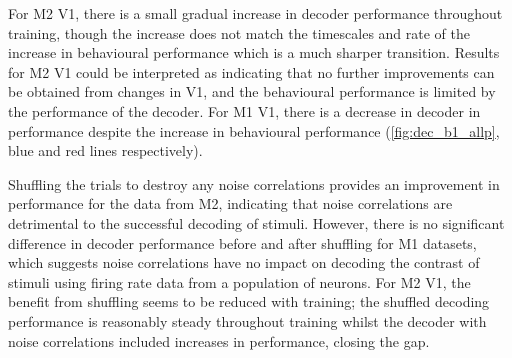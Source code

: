 For \ac{M2} \ac{V1}, there is a small gradual increase in decoder performance throughout training, though the increase does not match the timescales and rate of the increase in behavioural performance which is a much sharper transition.
Results for \ac{M2} \ac{V1} could be interpreted as indicating that no further improvements can be obtained from changes in \ac{V1}, and the behavioural performance is limited by the performance of the decoder.
For \ac{M1} \ac{V1}, there is a decrease in decoder in performance despite the increase in behavioural performance (\autoref{fig:dec_b1_allp}, blue and red lines respectively).


Shuffling the trials to destroy any noise correlations provides an improvement in performance for the data from \ac{M2}, indicating that noise correlations are detrimental to the successful decoding of stimuli.
However, there is no significant difference in decoder performance before and after shuffling for \ac{M1} datasets, which suggests noise correlations have no impact on decoding the contrast of stimuli using firing rate data from a population of neurons.
For \ac{M2} \ac{V1}, the benefit from shuffling seems to be reduced with training; the shuffled decoding performance is reasonably steady throughout training whilst the decoder with noise correlations included increases in performance, closing the gap.



